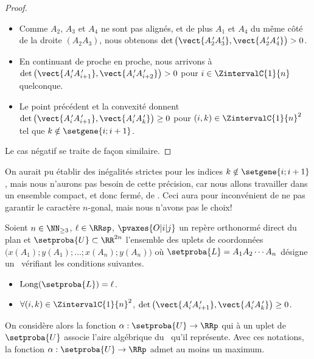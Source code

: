 \begin{proof}
\begin{itemize}
		\item Comme $A_2$, $A_3$ et $A_4$ ne sont pas alignés, et de plus $A_1$ et $A_4$ du même côté de la droite $(A_2 A_3)$, nous obtenons
		$\det \big( \vect{A^{\,\prime}_2 A^{\,\prime}_3}, \vect{A^{\,\prime}_2 A^{\,\prime}_4} \big) > 0$.


		\item En continuant de proche en proche, nous arrivons à
		$\det \big( \vect{A^{\,\prime}_i A^{\,\prime}_{i+1}}, \vect{A^{\,\prime}_i A^{\,\prime}_{i+2}} \big) > 0$
		pour $i \in \ZintervalC{1}{n}$ quelconque.


		\item Le point précédent et la convexité donnent
		$\det \big( \vect{A^{\,\prime}_i A^{\,\prime}_{i+1}}, \vect{A^{\,\prime}_i A^{\,\prime}_k} \big) \geq 0$
		pour $(i, k) \in \ZintervalC{1}{n}^2$ tel que $k \notin \setgene{i ; i+1}$.
    \end{itemize}

    \smallskip
    
    Le cas négatif se traite de façon similaire. 
\end{proof}




On aurait pu établir des inégalités strictes pour les indices $k \notin \setgene{i ; i+1}$, mais nous n'aurons pas besoin de cette précision, car nous allons travailler dans un ensemble compact, et donc fermé, de \ncycles.
Ceci aura pour inconvénient de ne pas garantir le caractère $n$-gonal, mais nous n'avons pas le choix!


\begin{fact} \label{at-least-one-ncycle}
    Soient $n \in \NN_{\geq3}$,
    $\ell \in \RRsp$,
    $\pvaxes{O | i | j}$ un repère orthonormé direct du plan
    et
    $\setproba{U} \subset \RR^{2n}$ l'ensemble des uplets de coordonnées $\big( x(A_1) ; y(A_1) ; \dots ; x(A_n) ; y(A_n) \big)$ où $\setproba{L} = A_1 A_2 \cdots A_n$ désigne un \ncycle\ vérifiant les conditions suivantes.
    \begin{itemize}
        \item $\cyclelen{\setproba{L}} = \ell$.
    
        \item  $\forall (i, k) \in \ZintervalC{1}{n}^2$,
		$\det \big( \vect{A^{\,\prime}_i A^{\,\prime}_{i+1}}, \vect{A^{\,\prime}_i A^{\,\prime}_k} \big) \geq 0$.
    \end{itemize}
    
    On considère alors la fonction $\alpha: \setproba{U} \rightarrow \RRp$ qui à un uplet de $\setproba{U}$ associe l'aire algébrique du \ncycle\ qu'il représente.
	Avec ces notations, la fonction $\alpha: \setproba{U} \rightarrow \RRp$ admet au moins un maximum.
\end{fact}


